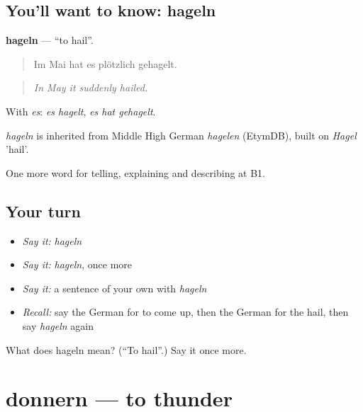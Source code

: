 \subsection*{You'll want to know: hageln}
\textbf{hageln} — \textquotedblleft{}to hail\textquotedblright{}.

\begin{quote}
Im Mai hat es plötzlich gehagelt.
\end{quote}

\begin{quote}
\emph{In May it suddenly hailed.}
\end{quote}

With \emph{es}: \emph{es hagelt}, \emph{es hat gehagelt}.

\begin{cousinweb}
\emph{hageln} is inherited from Middle High German \emph{hagelen} (EtymDB), built on \emph{Hagel} 'hail'.
\end{cousinweb}

\begin{grammarlens}[title={What you've built}]
One more word for telling, explaining and describing at B1.
\end{grammarlens}

\subsection*{Your turn}
\begin{itemize}
\raggedright
  \item \emph{Say it:} \emph{hageln}
  \item \emph{Say it:} \emph{hageln}, once more
  \item \emph{Say it:} a sentence of your own with \emph{hageln}
  \item \emph{Recall:} say the German for to come up, then the German for the hail, then say \emph{hageln} again
\end{itemize}

\begin{tcolorbox}[breakable,colback=teal!4,colframe=teal!35!black,title={Before you move on}]
What does hageln mean? (\textquotedblleft{}To hail\textquotedblright{}.) Say it once more.
\end{tcolorbox}
\section[donnern]{donnern — to thunder}

\label{lesson:GE-C462-donnern}




